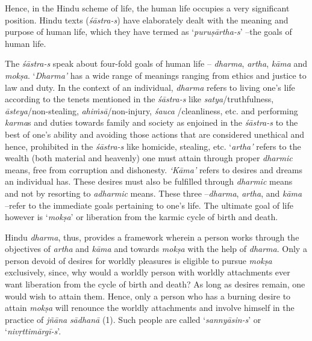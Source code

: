 Hence, in the Hindu scheme of life, the human life occupies a very significant position. Hindu texts (\emph{śāstra-s}) have elaborately dealt with the meaning and purpose of human life, which they have termed as `\emph{puruṣārtha-s}' --the goals of human life.

The \emph{śāstra-s} speak about four-fold goals of human life -- \emph{dharma}, \emph{artha}, \emph{kāma} and \emph{mokṣa}. `\emph{Dharma'} has a wide range of meanings ranging from ethics and justice to law and duty. In the context of an individual, \emph{dharma} refers to living one's life according to the tenets mentioned in the \emph{śāstra-s} like \emph{satya}/truthfulness, \emph{āsteya}/non-stealing, \emph{ahiṁsā}/non-injury, \emph{śauca} /cleanliness, etc. and performing \emph{karma}s and duties towards family and society as enjoined in the \emph{śāstra-s} to the best of one's ability and avoiding those actions that are considered unethical and hence, prohibited in the \emph{śāstra-s} like homicide, stealing, etc. `\emph{artha'} refers to the wealth (both material and heavenly) one must attain through proper \emph{dharmic} means, free from corruption and dishonesty. \emph{`Kāma'} refers to desires and dreams an individual has. These desires must also be fulfilled through \emph{dharmic} means and not by resorting to \emph{adharmic} means. These three --\emph{dharma}, \emph{artha}, and \emph{kāma} --refer to the immediate goals pertaining to one's life. The ultimate goal of life however is `\emph{mokṣa}' or liberation from the karmic cycle of birth and death.

Hindu \emph{dharma}, thus, provides a framework wherein a person works through the objectives of \emph{artha} and \emph{kāma} and towards \emph{mokṣa} with the help of \emph{dharma}. Only a person devoid of desires for worldly pleasures is eligible to pursue \emph{mokṣa} exclusively, since, why would a worldly person with worldly attachments ever want liberation from the cycle of birth and death? As long as desires remain, one would wish to attain them. Hence, only a person who has a burning desire to attain \emph{mokṣa} will renounce the worldly attachments and involve himself in the practice of \emph{jñāna} \emph{sādhanā} (1). Such people are called `\emph{sannyāsin-s}' or `\emph{nivṛttimārgī-s}'.

